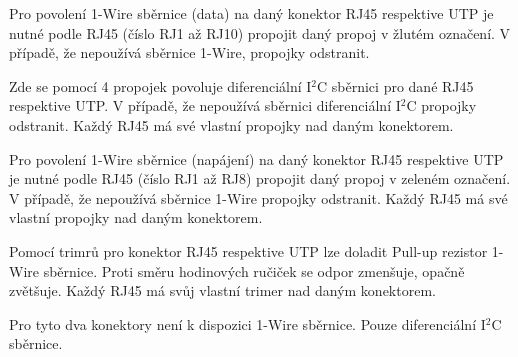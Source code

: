 \begin{Czech}
Pro povolení 1-Wire sběrnice (data) na daný konektor RJ45 respektive UTP je nutné podle RJ45 (číslo RJ1 až RJ10) propojit daný propoj v žlutém označení. V případě, že nepoužívá sběrnice 1-Wire, propojky odstranit.
\end{Czech}

\begin{Czech}
\end{Czech}

\begin{Czech}
Zde se pomocí 4 propojek povoluje diferenciální I$^2$C sběrnici pro dané RJ45 respektive UTP. V případě, že nepoužívá sběrnici diferenciální I$^2$C propojky odstranit. Každý RJ45 má své vlastní propojky nad daným konektorem.
\end{Czech}

\begin{Czech}
\end{Czech}

\begin{Czech}
Pro povolení 1-Wire sběrnice (napájení) na daný konektor RJ45 respektive UTP je nutné podle RJ45 (číslo RJ1 až RJ8) propojit daný propoj v zeleném označení. V případě, že nepoužívá sběrnice 1-Wire propojky odstranit. Každý RJ45 má své vlastní propojky nad daným konektorem.
\end{Czech}

\begin{Czech}
\end{Czech}

\begin{Czech}
Pomocí trimrů pro konektor RJ45 respektive UTP lze doladit Pull-up rezistor 1-Wire sběrnice. Proti směru hodinových ručiček se odpor zmenšuje, opačně zvětšuje. Každý RJ45 má svůj vlastní trimer nad daným konektorem.
\end{Czech}

\begin{Czech}
\end{Czech}

\begin{Czech}
Pro tyto dva konektory není k dispozici 1-Wire sběrnice. Pouze diferenciální I$^2$C sběrnice.
\end{Czech}

\begin{Czech}
\end{Czech}

